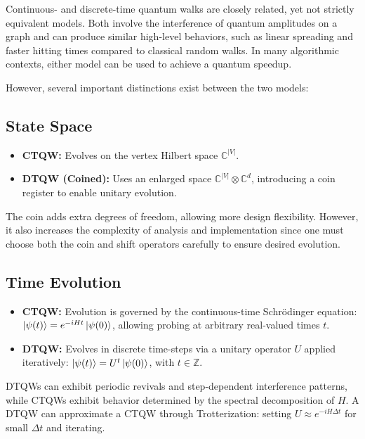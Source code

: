 \documentclass[12pt]{report}
\begin{document}
Continuous- and discrete-time quantum walks are closely related, yet not strictly equivalent models. Both involve the interference of quantum amplitudes on a graph and can produce similar high-level behaviors, such as linear spreading and faster hitting times compared to classical random walks. In many algorithmic contexts, either model can be used to achieve a quantum speedup.

However, several important distinctions exist between the two models:

\subsection{State Space}

\begin{itemize}
    \item \textbf{CTQW:} Evolves on the vertex Hilbert space $\mathbb{C}^{|V|}$.
    \item \textbf{DTQW (Coined):} Uses an enlarged space $\mathbb{C}^{|V|} \otimes \mathbb{C}^d$, introducing a coin register to enable unitary evolution.
\end{itemize}

The coin adds extra degrees of freedom, allowing more design flexibility. However, it also increases the complexity of analysis and implementation since one must choose both the coin and shift operators carefully to ensure desired evolution.

\subsection{Time Evolution}

\begin{itemize}
    \item \textbf{CTQW:} Evolution is governed by the continuous-time Schrödinger equation: $\ket{\psi(t)} = e^{-iHt} \ket{\psi(0)}$, allowing probing at arbitrary real-valued times $t$.
    \item \textbf{DTQW:} Evolves in discrete time-steps via a unitary operator $U$ applied iteratively: $\ket{\psi(t)} = U^t \ket{\psi(0)}$, with $t \in \mathbb{Z}$.
\end{itemize}

DTQWs can exhibit periodic revivals and step-dependent interference patterns, while CTQWs exhibit behavior determined by the spectral decomposition of $H$. A DTQW can approximate a CTQW through Trotterization: setting $U \approx e^{-iH \Delta t}$ for small $\Delta t$ and iterating.
\end{document}
